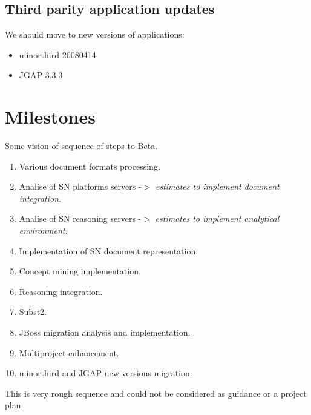 \documentclass[12pt]{article}
\begin{document}
\subsection{Third parity application updates}
We should move to new versions of applications:
\begin{itemize}
  \item minorthird 20080414
  \item JGAP 3.3.3
\end{itemize}

\section{Milestones}
Some vision of sequence of steps to Beta.
\begin{enumerate}
  \item Various document formats processing.
  \item Analise of SN platforms servers -$>$ \emph{estimates to implement document integration}.
  \item Analise of SN reasoning servers -$>$ \emph{estimates to implement analytical environment}.
  \item Implementation of SN document representation.
  \item Concept mining implementation.
  \item Reasoning integration.
  \item Subst2.
  \item JBoss migration analysis and implementation.
  \item Multiproject enhancement.
  \item minorthird and JGAP new versions migration.
\end{enumerate}
This is very rough sequence and could not be considered as guidance or a project plan.
\end{document}
